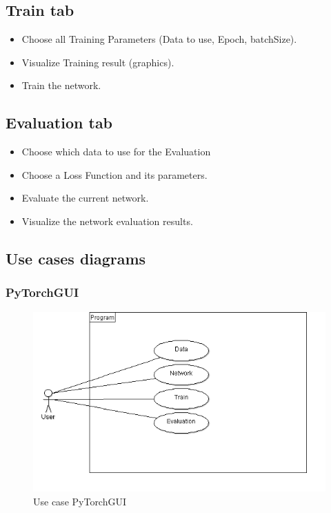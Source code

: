\subsection{Train tab} 
    \begin{itemize}
        \item Choose all Training Parameters (Data to use, Epoch, batchSize).
        \item Visualize Training result (graphics).
        \item Train the network.
    \end{itemize}
    
\subsection{Evaluation tab}
    \begin{itemize}
        \item Choose which data to use for the Evaluation
        \item Choose a Loss Function and its parameters.
        \item Evaluate the current network.
        \item Visualize the network evaluation results.
    \end{itemize}
    
\subsection{Use cases diagrams}
    \subsubsection{PyTorchGUI}
    \begin{figure}[htbp]
        \centering 
        \includegraphics[width=\textwidth]{figures/dcuProgram.png}
        \caption{Use case PyTorchGUI}
    \end{figure}

